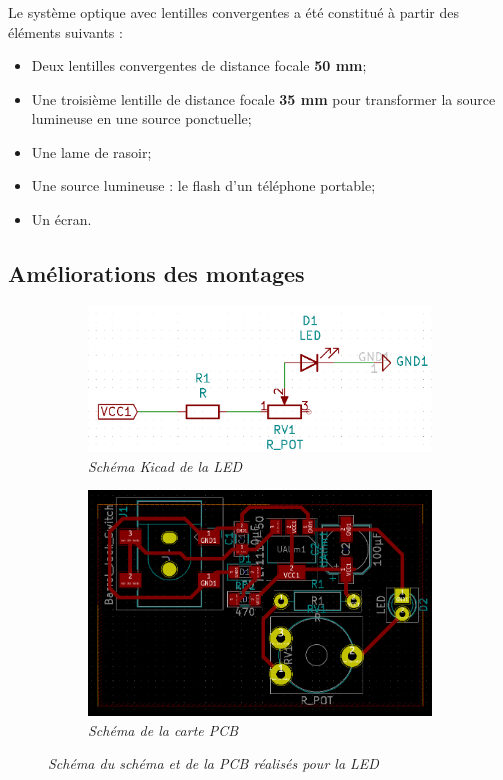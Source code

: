 \subsubsection{}
Le système optique avec lentilles convergentes a été constitué à partir des éléments suivants :
\begin{itemize}
	\item Deux lentilles convergentes de distance focale \textbf{50 mm};
	\item Une troisième lentille de distance focale \textbf{35 mm} pour transformer la source lumineuse en une source ponctuelle; 
	\item Une lame de rasoir;
	\item Une source lumineuse : le flash d'un téléphone portable;
	\item Un écran.
\end{itemize}
\subsection{Améliorations des montages}
\begin{figure}[H]
	\centering
	\begin{subfigure}[t]{0.49\textwidth}
		\centering
		\includegraphics[scale=0.2]{figures/schema_kicad.png}
		\caption{\small{\textit{Schéma Kicad de la LED}}}
		\label{fig:led_kicad}
	\end{subfigure}%
	\begin{subfigure}[t]{0.49\textwidth}
		\centering
		\includegraphics[scale=0.2]{figures/schema_pcb.png}
		\caption{\small{\textit{Schéma de la carte PCB}}}
		\label{fig:led_pcb}
	\end{subfigure}
	\caption{\small{\textit{Schéma du schéma et de la PCB réalisés pour la LED}}}
	\label{fig:led}
\end{figure}
